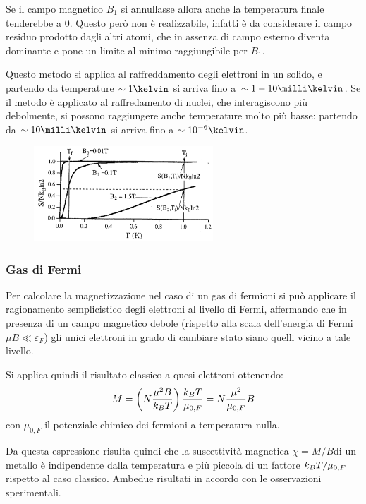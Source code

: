 Se il campo magnetico $ B_1 $ si annullasse allora anche la temperatura finale tenderebbe a $ 0 $. Questo però non è realizzabile, infatti è da considerare il campo residuo prodotto dagli altri atomi, che in assenza di campo esterno diventa dominante e pone un limite al minimo raggiungibile per $ B_1 $.

Questo metodo si applica al raffreddamento degli elettroni in un solido, e partendo da temperature $ \sim 1 \kelvin $ si arriva fino a $ \sim 1-10 \milli\kelvin $. Se il metodo è applicato al raffredamento di nuclei, che interagiscono più debolmente, si possono raggiungere anche temperature molto più basse: partendo da $ \sim 10 \milli\kelvin $ si arriva fino a $ \sim 10^{-6} \kelvin $.

\begin{figure}[h]
	\centering
	\includegraphics[width=0.6\textwidth]{Immagini/DemagnAdiabatica.png}
	\vspace{-10pt}
	\caption{}
	\label{fig:demagnad}
	\vspace{-10pt}
\end{figure}

\subsubsection{Gas di Fermi}

Per calcolare la magnetizzazione nel caso di un gas di fermioni si può applicare il ragionamento semplicistico degli elettroni al livello di Fermi, affermando che in presenza di un campo magnetico debole (rispetto alla scala dell'energia di Fermi $ \mu B \ll \varepsilon_F $) gli unici elettroni in grado di cambiare stato siano quelli vicino a tale livello.

Si applica quindi il risultato classico a quesi elettroni ottenendo:
\[ M = \left(N \frac{\mu^2 B}{k_B T}\right) \frac{k_B T}{\mu_{0,F}} = N \frac{\mu^2}{\mu_{0,F}} B\]
con $ \mu_{0,F} $ il potenziale chimico dei fermioni a temperatura nulla. 

Da questa espressione risulta quindi che la suscettività magnetica $ \chi = M/B $di un metallo è indipendente dalla temperatura e più piccola di un fattore $ k_B T/\mu_{0,F} $ rispetto al caso classico. Ambedue risultati in accordo con le osservazioni sperimentali.

